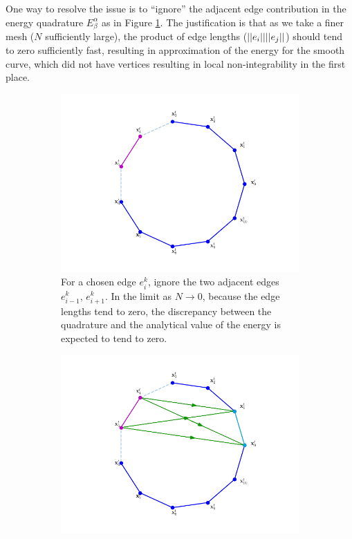 \documentclass[../dissertation.tex]{subfiles}
\begin{document}
One way to resolve the issue is to ``ignore'' the adjacent edge contribution\cite{YSC2021} in the energy quadrature $E_{\beta}^{\alpha}$ as in Figure \ref{fig: Energy discretization by ignoring adjacent edges}.
The justification is that as we take a finer mesh ($N$ sufficiently large), the product of edge lengths ($\lvert \lvert e_i \rvert \rvert\lvert \lvert e_j \rvert \rvert$) should tend to zero sufficiently fast, resulting in approximation of the energy for the smooth curve, which did not have vertices resulting in local non-integrability in the first place.
\begin{figure}[tbp]
    \centering
    \begin{subfigure}[b]{0.75\textwidth}
        \centering
        \includegraphics[width=\textwidth]{sections/unknottingCurveImgs/energyDiscretization1}
        \caption{For a chosen edge $e_i^k$, ignore the two adjacent edges $e_{i-1}^k$, $e_{i+1}^k$.
            In the limit as $N \rightarrow 0$, because the edge lengths tend to zero,
            the discrepancy between the quadrature and the analytical value of the energy is expected to tend to zero.
                }
        \label{fig: Energy discretization by ignoring adjacent edges}
    \end{subfigure}
    \par\bigskip
    \begin{subfigure}[b]{0.75\textwidth}
        \centering
        \includegraphics[width=\textwidth]{sections/unknottingCurveImgs/energyDiscretization2}

\end{subfigure}
\end{figure}
\end{document}
